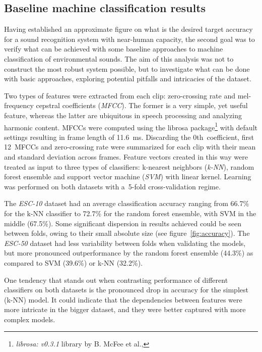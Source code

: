 \documentclass[letterpaper]{sig-alternate}
\begin{document}
\subsection{Baseline machine classification results}

Having established an approximate figure on what is the desired target accuracy for a sound recognition system with near-human capacity, the second goal was to verify what can be achieved with some baseline approaches to machine classification of environmental sounds. The aim of this analysis was not to construct the most robust system possible, but to investigate what can be done with basic approaches, exploring potential pitfalls and intricacies of the dataset.

Two types of features were extracted from each clip: zero-crossing rate and mel-frequency cepstral coefficients (\textit{MFCC}). The former is a very simple, yet useful feature, whereas the latter are ubiquitous in speech processing and analyzing harmonic content. MFCCs were computed using the librosa package\footnote{\textit{librosa: v0.3.1} library by B. McFee et al.,\newline {}} with default settings resulting in frame length of 11.6~ms. Discarding the 0th~coefficient, first 12~MFCCs and zero-crossing rate were summarized for each clip with their mean and standard deviation across frames. Feature vectors created in this way were treated as input to three types of classifiers: k-nearest neighbors (\textit{k-NN}), random forest ensemble and support vector machine (\textit{SVM}) with linear kernel. Learning was performed on both datasets with a~5-fold cross-validation regime.

The \textit{ESC-10} dataset had an average classification accuracy ranging from 66.7\% for the k-NN classifier to 72.7\% for the random forest ensemble, with SVM in the middle (67.5\%). Some significant dispersion in results achieved could be seen between folds, owing to their small absolute size (see figure~\ref{fig:accuracy}). The \textit{ESC-50} dataset had less variability between folds when validating the models, but more pronounced outperformance by the random forest ensemble (44.3\%) as compared to SVM (39.6\%) or k-NN (32.2\%).

One tendency that stands out when contrasting performance of different classifiers on both datasets is the pronounced drop in accuracy for the simplest (k-NN) model. It could indicate that the dependencies between features were more intricate in the bigger dataset, and they were better captured with more complex models.
\end{document}
